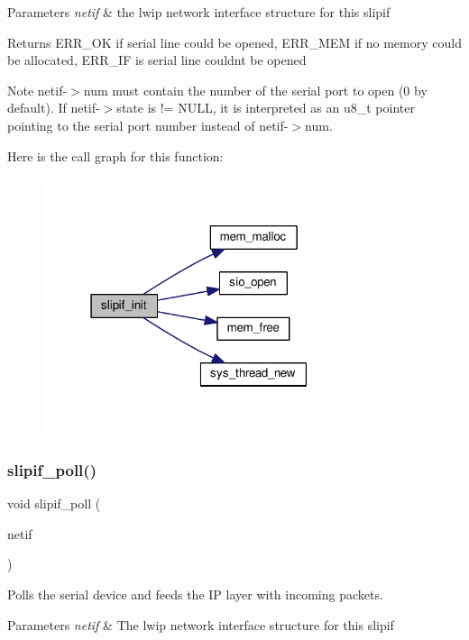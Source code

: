 \begin{DoxyParams}{Parameters}
{\em netif} & the lwip network interface structure for this slipif \\
\hline
\end{DoxyParams}
\begin{DoxyReturn}{Returns}
E\+R\+R\+\_\+\+OK if serial line could be opened, E\+R\+R\+\_\+\+M\+EM if no memory could be allocated, E\+R\+R\+\_\+\+IF is serial line couldn\textquotesingle{}t be opened
\end{DoxyReturn}
\begin{DoxyNote}{Note}
netif-\/$>$num must contain the number of the serial port to open (0 by default). If netif-\/$>$state is != N\+U\+LL, it is interpreted as an u8\+\_\+t pointer pointing to the serial port number instead of netif-\/$>$num. 
\end{DoxyNote}
Here is the call graph for this function\+:
\nopagebreak
\begin{figure}[H]
\begin{center}
\leavevmode
\includegraphics[width=259pt]{openmote-cc2538_2lwip_2src_2include_2netif_2slipif_8h_a687973ba82dab13a5b9d38d7399aeee3_cgraph}
\end{center}
\end{figure}
\mbox{\label{openmote-cc2538_2lwip_2src_2include_2netif_2slipif_8h_a7b036fd1cde9b299139cac62f52d15a6}} 
\subsubsection{\texorpdfstring{slipif\+\_\+poll()}{slipif\_poll()}}
{\footnotesize\ttfamily void slipif\+\_\+poll (\begin{DoxyParamCaption}\item[{struct \hyperlink{structnetif}{netif} $\ast$}]{netif }\end{DoxyParamCaption})}

Polls the serial device and feeds the IP layer with incoming packets.


\begin{DoxyParams}{Parameters}
{\em netif} & The lwip network interface structure for this slipif \\
\hline
\end{DoxyParams}
